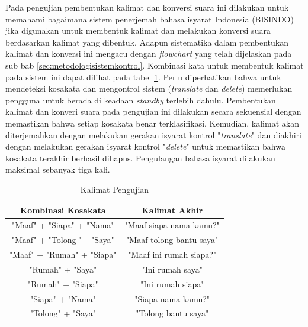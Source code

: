Pada pengujian pembentukan kalimat dan konversi suara ini dilakukan untuk memahami bagaimana sistem penerjemah bahasa isyarat Indonesia (BISINDO) jika digunakan untuk membentuk kalimat dan melakukan konversi suara berdasarkan kalimat yang dibentuk. Adapun sistematika dalam pembentukan kalimat dan konversi ini mengacu dengan \emph{flowchart} yang telah dijelaskan pada sub bab \ref{sec:metodologisistemkontrol}. Kombinasi kata untuk membentuk kalimat pada sistem ini dapat dilihat pada tabel \ref{tb:kalimatpengujian}. Perlu diperhatikan bahwa untuk mendeteksi kosakata dan mengontrol sistem (\emph{translate} dan \emph{delete}) memerlukan pengguna untuk berada di keadaan \emph{standby} terlebih dahulu. Pembentukan kalimat dan konveri suara pada pengujian ini dilakukan secara sekuensial dengan memastikan bahwa setiap kosakata benar terklasifikasi. Kemudian, kalimat akan diterjemahkan dengan melakukan gerakan isyarat kontrol "\emph{translate}" dan diakhiri dengan melakukan gerakan isyarat kontrol "\emph{delete}" untuk memastikan bahwa kosakata terakhir berhasil dihapus. Pengulangan bahasa isyarat dilakukan maksimal sebanyak tiga kali.

\begin{longtable}{|c|c|}
  \caption{Kalimat Pengujian}
  \label{tb:kalimatpengujian}                                   \\
  \hline
  \rowcolor[HTML]{C0C0C0}
  \textbf{Kombinasi Kosakata} & \textbf{Kalimat Akhir}  \\
  \hline
  "Maaf" + "Siapa" + "Nama"            &  "Maaf siapa nama kamu?"               \\

  "Maaf" + "Tolong "+ "Saya"            & "Maaf tolong bantu saya"                 \\
  
  "Maaf" + "Rumah" + "Siapa"            & "Maaf ini rumah siapa?"                 \\

  "Rumah" + "Saya"            & "Ini rumah saya"                 \\

  "Rumah" + "Siapa"            & "Ini rumah siapa"                 \\

  "Siapa" + "Nama"            & "Siapa nama kamu?"                 \\

  "Tolong" + "Saya"            & "Tolong bantu saya"                 \\
  \hline
\end{longtable}

